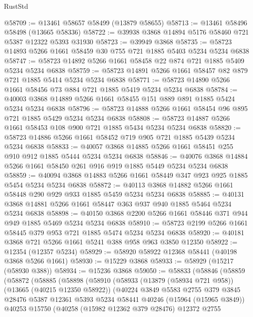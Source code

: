 \begin{lexlean}{RustStd}
\begin{coremodule}
@58709 := @13461 @58657 @58499 (@13879 @58655)
@58713 := @13461 @58496 @58498 (@13665 @58336)
@58722 := @39938 @3868 @14894 @5176 @58460 @721 @5387 @12322 @5393 @31930
@58723 := @39949 @3868
@58735 := @58723 @14893 @5266 @1661 @58459 @30 @755 @721 @1885 @5403 @5234 @5234 @6838
@58747 := @58723 @14892 @5266 @1661 @58458 @22 @874 @721 @1885 @5409 @5234 @5234 @6838
@58759 := @58723 @14891 @5266 @1661 @58457 @82 @879 @721 @1885 @5414 @5234 @5234 @6838
@58771 := @58723 @14890 @5266 @1661 @58456 @73 @884 @721 @1885 @5419 @5234 @5234 @6838
@58784 := @40003 @3868 @14889 @5266 @1661 @58455 @151 @889 @891 @1885 @5424 @5234 @5234 @6838
@58796 := @58723 @14888 @5266 @1661 @58454 @96 @895 @721 @1885 @5429 @5234 @5234 @6838
@58808 := @58723 @14887 @5266 @1661 @58453 @108 @900 @721 @1885 @5434 @5234 @5234 @6838
@58820 := @58723 @14886 @5266 @1661 @58452 @719 @905 @721 @1885 @5439 @5234 @5234 @6838
@58833 := @40057 @3868 @14885 @5266 @1661 @58451 @255 @910 @912 @1885 @5444 @5234 @5234 @6838
@58846 := @40076 @3868 @14884 @5266 @1661 @58450 @261 @916 @919 @1885 @5449 @5234 @5234 @6838
@58859 := @40094 @3868 @14883 @5266 @1661 @58449 @347 @923 @925 @1885 @5454 @5234 @5234 @6838
@58872 := @40113 @3868 @14882 @5266 @1661 @58448 @290 @929 @933 @1885 @5459 @5234 @5234 @6838
@58885 := @40131 @3868 @14881 @5266 @1661 @58447 @363 @937 @940 @1885 @5464 @5234 @5234 @6838
@58898 := @40150 @3868 @2200 @5266 @1661 @58446 @371 @944 @949 @1885 @5469 @5234 @5234 @6838
@58910 := @58723 @2199 @5266 @1661 @58445 @379 @953 @721 @1885 @5474 @5234 @5234 @6838
@58920 := @40181 @3868 @721 @5266 @1661 @5241 @388 @958 @963 @3850 @12350
@58922 := @12354 (@12357 @5234)
@58929 := @58920 @58922 @12368 @58441 (@40198 @3868 @5266 @1661)
@58930 := @15229 @3868
@58933 := @58929 (@15217 (@58930 @388))
@58934 := @15236 @3868
@59050 := @58833
    (@58846
      (@58859
        (@58872
          (@58885
            (@58898
              (@58910
                (@58933
                  (@13879 (@58934 @721 @958))
                  (@13665 (@40215 @12350 @58922))
                  (@40224
                    @3849
                    @5583
                    @2755
                    @379
                    @3845
                    @28476
                    @5387
                    @12361
                    @5393
                    @5234
                    @58441
                    @40246
                    (@15964 (@15965 @3849))
                    @40253
                    @15750
                    (@40258
                      (@15982 @12362 @379 @28476)
                      @12372
                      @2755

\end{coremodule}
\end{lexlean}
